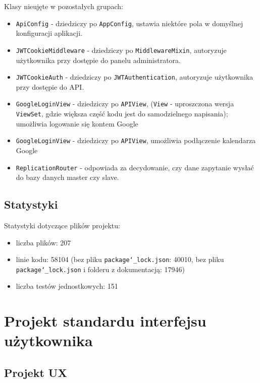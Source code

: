 \documentclass[11pt,a4paper]{article}
\renewcommand{\_}{\char`_}
\begin{document}
Klasy nieujęte w pozostałych grupach:
\begin{itemize}
    \item \texttt{ApiConfig} - dziedziczy po \texttt{AppConfig}, ustawia niektóre pola w domyślnej konfiguracji aplikacji.
    \item \texttt{JWTCookieMiddleware} - dziedziczy po \texttt{MiddlewareMixin}, autoryzuje użytkownika przy dostępie do panelu administratora.
    \item \texttt{JWTCookieAuth} - dziedziczy po \texttt{JWTAuthentication}, autoryzuje użytkownika przy dostępie do API.
    \item \texttt{GoogleLoginView} - dziedziczy po \texttt{APIView}, (\texttt{View} - uproszczona wersja \texttt{ViewSet}, gdzie większa część kodu jest do samodzielnego napisania); umożliwia logowanie się kontem Google
    \item \texttt{GoogleLoginView} - dziedziczy po \texttt{APIView}, umożliwia podłączenie kalendarza Google
    \item \texttt{ReplicationRouter} - odpowiada za decydowanie, czy dane zapytanie wysłać do bazy danych master czy slave.
\end{itemize}

\subsection{Statystyki}

Statystyki dotyczące plików projektu:
\begin{itemize}
    \item liczba plików: 207
    \item linie kodu: 58104 (bez pliku \texttt{package\_lock.json}: 40010, bez pliku \texttt{package\_lock.json} i folderu z dokumentacją: 17946)
    \item liczba testów jednostkowych: 151
\end{itemize}

\section{Projekt standardu interfejsu użytkownika}

\subsection{Projekt UX}
\end{document}
